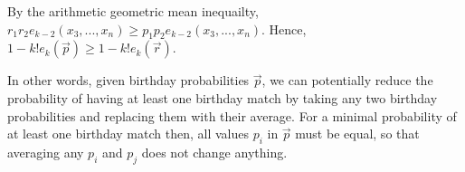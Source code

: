 \begin{enumerate}[label=(\alph*)]
  By the arithmetic geometric mean inequailty, 
  $r_{1}r_{2}e_{k-2}(x_{3},...,x_{n}) \geq p_{1}p_{2}e_{k-2}(x_{3},...,x_{n})$. 
  Hence, $1 - k!e_{k}(\overrightarrow{p}) \geq 1 - k!e_{k}(\overrightarrow{r})$.

  In other words, given birthday probabilities $\overrightarrow{p}$, we can 
  potentially reduce the probability of having at least one birthday match by 
  taking any two birthday probabilities and replacing them with their average. 
  For a minimal probability of at least one birthday match then, all  values 
  $p_{i}$ in $\overrightarrow{p}$ must be equal, so that averaging any $p_{i}$ 
  and $p_{j}$ does not change anything. 


\end{enumerate}